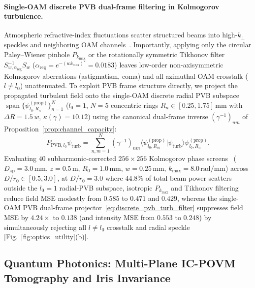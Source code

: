 \documentclass[aps,pra,onecolumn,notitlepage,11pt,tightenlines,amsmath,amssymb,floatfix,longbibliography]{revtex4-2}
\providecommand{\braket}[2]{\langle#1\vert#2\rangle}
\begin{document}
\paragraph*{Single-OAM discrete PVB dual-frame filtering in Kolmogorov turbulence.}
Atmospheric refractive-index fluctuations scatter structured beams into high-$k_\perp$ speckles and neighboring OAM channels~\cite{Paterson2005,TylerBoyd2009,AndrewsPhillips2005}. Importantly, applying only the circular Paley--Wiener pinhole $P_{k_{\max}}$ or the rotationally symmetric Tikhonov filter $S_{w,\alpha_{\mathrm{reg}}}^{-1}S_w$ ($\alpha_{\mathrm{reg}} = e^{-(w k_{\max})^2} = 0.0183$) leaves low-order non-axisymmetric Kolmogorov aberrations (astigmatism, coma) and all azimuthal OAM crosstalk ($l \neq l_0$) unattenuated. To exploit PVB frame structure directly, we project the propagated turbulent field onto the single-OAM discrete radial PVB subspace $\operatorname{span}\{\psi_{l_0,R_n}^{(\mathrm{prop})}\}_{n=1}^N$ ($l_0 = 1$, $N = 5$ concentric rings $R_n \in [0.25, 1.75]\,\mathrm{mm}$ with $\Delta R = 1.5\,w$, $\kappa(\gamma) = 10.12$) using the canonical dual-frame inverse $(\gamma^{-1})_{nm}$ of Proposition~\ref{prop:channel_capacity}:
\begin{equation}
P_{\mathrm{PVB},l_0}\psi_{\mathrm{turb}} = \sum_{n,m=1}^N (\gamma^{-1})_{nm}\braket{\psi_{l_0,R_m}^{(\mathrm{prop})}}{\psi_{\mathrm{turb}}}\psi_{l_0,R_n}^{(\mathrm{prop})}.
\label{eq:discrete_pvb_turb_filter}
\end{equation}
Evaluating $40$ subharmonic-corrected $256\times 256$ Kolmogorov phase screens~\cite{Lane1992} ($D_{\mathrm{ap}} = 3.0\,\mathrm{mm}$, $z = 0.5\,\mathrm{m}$, $R_0 = 1.0\,\mathrm{mm}$, $w = 0.25\,\mathrm{mm}$, $k_{\max} = 8.0\,\mathrm{rad/mm}$) across $D/r_0 \in [0.5, 3.0]$, at $D/r_0 = 3.0$ where $44.8\%$ of total beam power scatters outside the $l_0 = 1$ radial-PVB subspace, isotropic $P_{k_{\max}}$ and Tikhonov filtering reduce field MSE modestly from $0.585$ to $0.471$ and $0.429$, whereas the single-OAM PVB dual-frame projector~\eqref{eq:discrete_pvb_turb_filter} suppresses field MSE by $4.24\times$ to $0.138$ (and intensity MSE from $0.553$ to $0.248$) by simultaneously rejecting all $l \neq l_0$ crosstalk and radial speckle [Fig.~\ref{fig:optics_utility}(b)].

\subsection{Quantum Photonics: Multi-Plane IC-POVM Tomography and Iris Invariance}
\label{subsec:quantum_utility}
\end{document}
